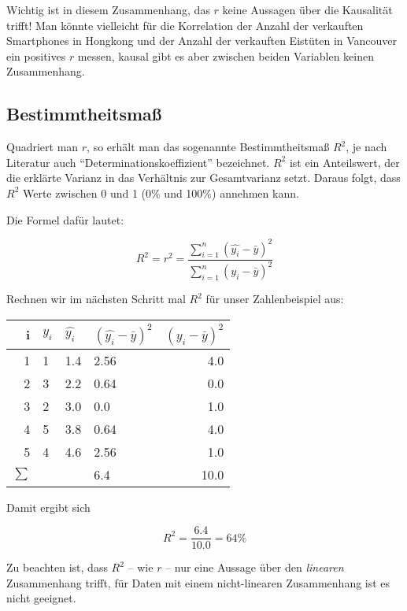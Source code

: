 \documentclass[ngerman, 12pt]{scrartcl}
\begin{document}
Wichtig ist in diesem Zusammenhang, das \(r\) keine Aussagen über die Kausalität trifft! Man könnte vielleicht für die Korrelation der Anzahl der verkauften Smartphones in Hongkong und der Anzahl der verkauften Eistüten in Vancouver ein positives \(r\) messen, kausal gibt es aber zwischen beiden Variablen keinen Zusammenhang.



\subsection{Bestimmtheitsmaß}

Quadriert man \(r\), so erhält man das sogenannte Bestimmtheitsmaß \(R^2\), je nach Literatur auch \enquote{Determinationskoeffizient} bezeichnet. \(R^2\) ist ein Anteilswert, der die erklärte Varianz in das Verhältnis zur Gesamtvarianz setzt. Daraus folgt, dass \(R^2\) Werte zwischen 0 und 1 (0\% und 100\%) annehmen kann. 

Die Formel dafür lautet:

\begin{equation}
R^2 = r^2 = \frac{\sum_{i=1}^n (\hat{y_i} - \bar{y})^2} {\sum_{i=1}^n (y_i - \bar{y})^2}
\end{equation}

Rechnen wir im nächsten Schritt mal \(R^2\) für unser Zahlenbeispiel aus:

\begin{center}
\begin{tabular}{r|lllr} \toprule
i & \(y_i\)  & \(\hat{y_i}\) & \((\hat{y_i} - \bar{y})^2 \)&  \((y_i - \bar{y})^2\) \\ \midrule
1 & 1 &  1.4 & 2.56    & 4.0\\
2 & 3 &  2.2 &  0.64 & 0.0\\
3 & 2 &  3.0 & 0.0     & 1.0\\ 
4 & 5 &  3.8 & 0.64    & 4.0\\ 
5 & 4 &  4.6 & 2.56    & 1.0\\ \midrule
\(\sum\) & & & 6.4 & 10.0\\ \bottomrule
\end{tabular}
\end{center}

Damit ergibt sich

\begin{equation}
R^2 = \frac{6.4}{10.0} = 64 \%
\end{equation}


Zu beachten ist, dass \(R^2\) -- wie \(r\) -- nur eine Aussage über den \textit{linearen} Zusammenhang trifft, für Daten mit einem nicht-linearen Zusammenhang ist es nicht geeignet.
\end{document}
